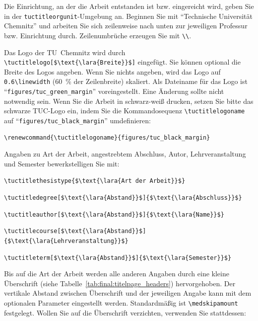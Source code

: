 Die Einrichtung, an der die Arbeit entstanden ist bzw. eingereicht wird, geben
Sie in der \texttt{tuctitleorgunit}-Umgebung an. Beginnen Sie mit "`Technische
Universität Chemnitz"' und arbeiten Sie sich zeilenweise nach unten zur
jeweiligen Professur bzw. Einrichtung durch. Zeilenumbrüche erzeugen Sie mit
\verb+\\+.

Das Logo der TU~Chemnitz wird durch \lstinline[language={[LaTeX]{TeX}},mathescape]+\tuctitlelogo[$\text{\lara{Breite}}$]+
eingefügt. Sie können optional die Breite des Logos angeben. Wenn Sie nichts
angeben, wird das Logo auf \verb+0.6\linewidth+ (\qty{60}{\percent} der
Zeilenbreite) skaliert. Als Dateiname für das Logo ist
"`\texttt{figures/tuc\_green\_margin}"' voreingestellt. Eine Änderung sollte
nicht notwendig sein. Wenn Sie die Arbeit in schwarz-weiß drucken, setzen Sie
bitte das schwarze TUC-Logo ein, indem Sie die Kommandosequenz
\verb+\tuctitlelogoname+ auf "`\texttt{figures/tuc\_black\_margin}"'
umdefinieren:
%
\begin{lstlisting}[language={[LaTeX]{TeX}},style=block]
\renewcommand{\tuctitlelogoname}{figures/tuc_black_margin}
\end{lstlisting}

Angaben zu Art der Arbeit, angestrebtem Abschluss, Autor, Lehrveranstaltung und
Semester bewerkstelligen Sie mit:

\begin{compactitem}
\item \lstinline[language={[LaTeX]{TeX}},mathescape]+\tuctitlethesistype{$\text{\lara{Art der Arbeit}}$}+
\item \lstinline[language={[LaTeX]{TeX}},mathescape]+\tuctitledegree[$\text{\lara{Abstand}}$]{$\text{\lara{Abschluss}}$}+
\item \lstinline[language={[LaTeX]{TeX}},mathescape]+\tuctitleauthor[$\text{\lara{Abstand}}$]{$\text{\lara{Name}}$}+
\item \lstinline[language={[LaTeX]{TeX}},mathescape]+\tuctitlecourse[$\text{\lara{Abstand}}$]{$\text{\lara{Lehrveranstaltung}}$}+
\item \lstinline[language={[LaTeX]{TeX}},mathescape]+\tuctitleterm[$\text{\lara{Abstand}}$]{$\text{\lara{Semester}}$}+
\end{compactitem}

Bis auf die Art der Arbeit werden alle anderen Angaben durch eine kleine
Überschrift (siehe Tabelle~\ref{tab:final:titelpage_headers}) hervorgehoben.
Der vertikale Abstand zwischen Überschrift und der jeweiligen Angabe kann mit
dem optionalen Parameter eingestellt werden. Standardmäßig ist
\verb+\medskipamount+ festgelegt. Wollen Sie auf die Überschrift verzichten,
verwenden Sie stattdessen:

